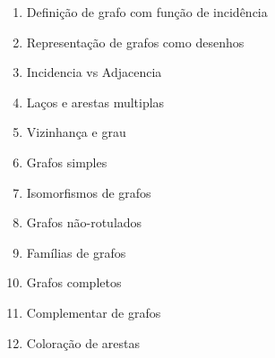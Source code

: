 \begin{enumerate}
\item Definição de grafo com função de incidência
\item Representação de grafos como desenhos
\item Incidencia vs Adjacencia
\item Laços e arestas multiplas
\item Vizinhança e grau
\item Grafos simples
\item Isomorfismos de grafos
\item Grafos não-rotulados
\item Famílias de grafos
\item Grafos completos
\item Complementar de grafos
\item Coloração de arestas
\end{enumerate}







